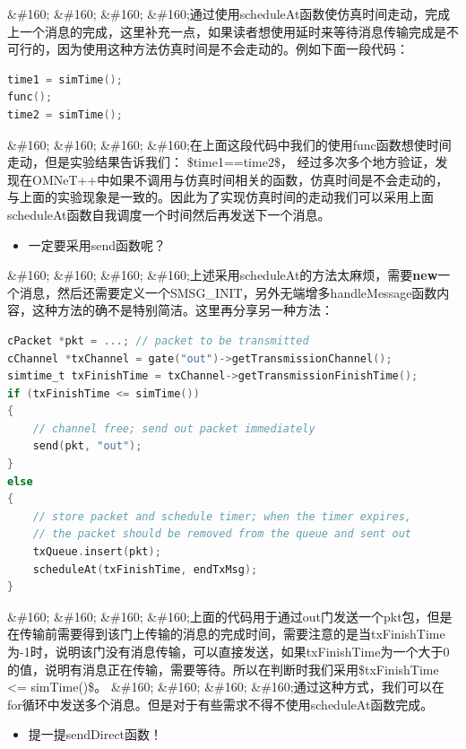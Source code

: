 \&\#160; \&\#160; \&\#160; \&\#160;通过使用scheduleAt函数使仿真时间走动，完成上一个消息的完成，这里补充一点，如果读者想使用延时来等待消息传输完成是不可行的，因为使用这种方法仿真时间是不会走动的。例如下面一段代码：

\begin{lstlisting}[language=c,caption=My]
time1 = simTime();
func();
time2 = simTime();
\end{lstlisting}

\&\#160; \&\#160; \&\#160; \&\#160;在上面这段代码中我们的使用func函数想使时间走动，但是实验结果告诉我们：
\$time1==time2\$，
经过多次多个地方验证，发现在OMNeT++中如果不调用与仿真时间相关的函数，仿真时间是不会走动的，与上面的实验现象是一致的。因此为了实现仿真时间的走动我们可以采用上面scheduleAt函数自我调度一个时间然后再发送下一个消息。

\begin{itemize}
\item 一定要采用send函数呢？

\end{itemize}

\&\#160; \&\#160; \&\#160; \&\#160;上述采用scheduleAt的方法太麻烦，需要\textbf{new}一个消息，然后还需要定义一个SMSG\_INIT，另外无端增多handleMessage函数内容，这种方法的确不是特别简洁。这里再分享另一种方法：

\begin{lstlisting}[language=c,caption=My]
cPacket *pkt = ...; // packet to be transmitted
cChannel *txChannel = gate("out")->getTransmissionChannel();
simtime_t txFinishTime = txChannel->getTransmissionFinishTime();
if (txFinishTime <= simTime())
{
    // channel free; send out packet immediately
    send(pkt, "out");
}
else
{
    // store packet and schedule timer; when the timer expires,
    // the packet should be removed from the queue and sent out
    txQueue.insert(pkt);
    scheduleAt(txFinishTime, endTxMsg);
}

\end{lstlisting}

\&\#160; \&\#160; \&\#160; \&\#160;上面的代码用于通过out门发送一个pkt包，但是在传输前需要得到该门上传输的消息的完成时间，需要注意的是当txFinishTime为-1时，说明该门没有消息传输，可以直接发送，如果txFinishTime为一个大于0的值，说明有消息正在传输，需要等待。所以在判断时我们采用\$txFinishTime <= simTime()\$。
\&\#160; \&\#160; \&\#160; \&\#160;通过这种方式，我们可以在for循环中发送多个消息。但是对于有些需求不得不使用scheduleAt函数完成。

\begin{itemize}
\item 提一提sendDirect函数！

\end{itemize}

